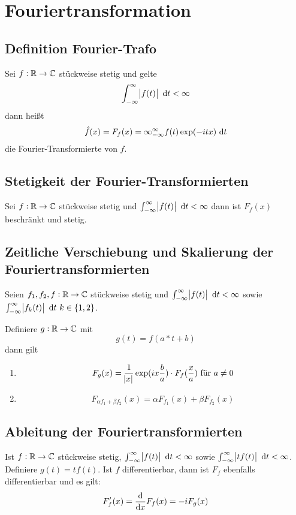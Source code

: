 \section{Fouriertransformation}
\subsection{Definition Fourier-Trafo}
Sei $f: \mathbb{R} \to \mathbb{C}$ stückweise stetig und gelte
\begin{equation*}
    \int_{-\infty}^\infty \abs{f(t)} \text{ d}t < \infty
\end{equation*}
dann heißt
\begin{equation*}
    \hat{f}(x) = F_f(x) = \infty_{-\infty}^\infty
    f(t) \exp(-itx) \text{ d}t
\end{equation*}
die Fourier-Transformierte von $f$.

\subsection{Stetigkeit der Fourier-Transformierten}
Sei $f: \mathbb{R} \to \mathbb{C}$ stückweise stetig und $\int_{-\infty}^\infty \abs{f(t)} \text{ d}t < \infty$
dann ist $F_f(x)$ beschränkt und stetig.

\subsection{Zeitliche Verschiebung und Skalierung der Fouriertransformierten}
Seien $f_1, f_2, f: \mathbb{R} \to \mathbb{C}$ stückweise stetig und $\int_{-\infty}^\infty \abs{f(t)} \text{ d}t < \infty$ sowie
$\int_{-\infty}^\infty \abs{f_k(t)} \text{ d}t\ k \in \{1,2\}$.

Definiere $g: \mathbb{R} \to \mathbb{C}$ mit
\begin{equation*}
    g(t) = f(a*t + b)
\end{equation*}
dann gilt
\begin{enumerate}
    \item 
        \begin{equation*}
            F_g(x) = \frac{1}{\abs{x}} \exp(i x \frac{b}{a}) \cdot F_f(\frac{x}{a})\ \text{für } a \neq 0
        \end{equation*}
    \item
        \begin{equation*}
            F_{\alpha f_1 + \beta f_2} (x) = \alpha F_{f_1}(x) + \beta F_{f_2}(x)
        \end{equation*}
\end{enumerate}

\subsection{Ableitung der Fouriertransformierten}
Ist $f: \mathbb{R} \to \mathbb{C}$ stückweise stetig, $\int_{-\infty}^\infty \abs{f(t)} \text{ d}t < \infty$ sowie
$\int_{-\infty}^\infty \abs{t f(t)}\text{ d}t < \infty$. Definiere $g(t) = t f(t)$. Ist $f$ differentierbar, dann ist 
$F_f$ ebenfalls differentierbar und es gilt:
\begin{equation*}
    F_f'(x) = \dfrac{\text{d}}{\text{d}x} F_f(x) = -i F_g(x)
\end{equation*}

